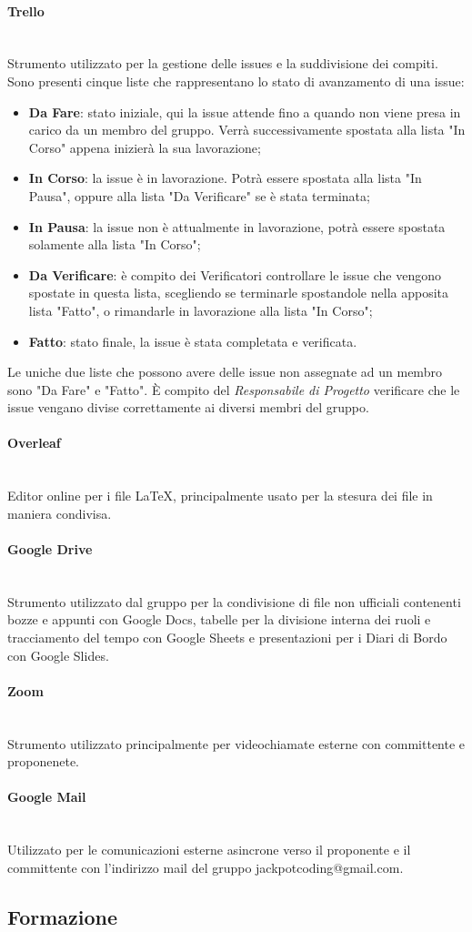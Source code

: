\documentclass{article}
\begin{document}
\paragraph{Trello}~\\
Strumento utilizzato per la gestione delle issues e la suddivisione dei compiti. Sono presenti cinque liste che rappresentano lo stato di avanzamento di una issue:
\begin{itemize} 
    \item\textbf{Da Fare}: stato iniziale, qui la issue attende fino a quando non viene presa in carico da un membro del gruppo. Verrà successivamente spostata alla lista "In Corso" appena inizierà la sua lavorazione;
    \item\textbf{In Corso}: la issue è in lavorazione. Potrà essere spostata alla lista "In Pausa", oppure alla lista "Da Verificare" se è stata terminata;
    \item\textbf{In Pausa}: la issue non è attualmente in lavorazione, potrà essere spostata solamente alla lista "In Corso";
    \item\textbf{Da Verificare}: è compito dei Verificatori controllare le issue che vengono spostate in questa lista, scegliendo se terminarle spostandole nella apposita lista "Fatto", o rimandarle in lavorazione alla lista "In Corso";
    \item\textbf{Fatto}: stato finale, la issue è stata completata e verificata.
\end{itemize}
Le uniche due liste che possono avere delle issue non assegnate ad un membro sono "Da Fare" e "Fatto".
È compito del \textit{Responsabile di Progetto} verificare che le issue vengano divise correttamente ai diversi membri del gruppo. 
\paragraph{Overleaf}~\\
Editor online per i file LaTeX, principalmente usato per la stesura dei file in maniera condivisa.
\paragraph{Google Drive}~\\
Strumento utilizzato dal gruppo per la condivisione di file non ufficiali contenenti bozze e appunti con Google Docs, tabelle per la divisione interna dei ruoli e tracciamento del tempo con Google Sheets e presentazioni per i Diari di Bordo con Google Slides. 
\paragraph{Zoom}~\\
Strumento utilizzato principalmente per videochiamate esterne con committente e proponenete.
\paragraph{Google Mail}~\\
Utilizzato per le comunicazioni esterne asincrone verso il proponente e il committente con l'indirizzo mail del gruppo jackpotcoding@gmail.com.

\subsection{Formazione}
\end{document}
